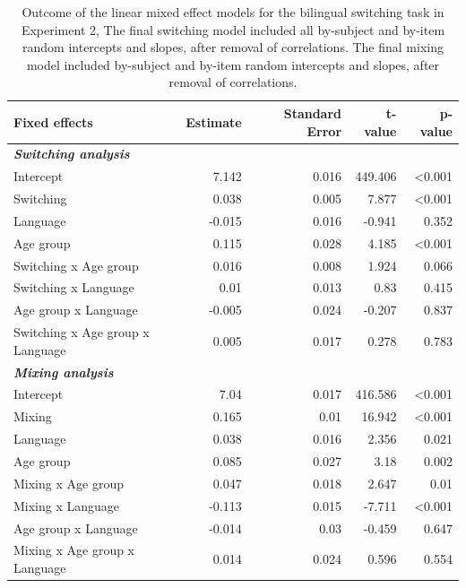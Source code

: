 \documentclass[
]{article}
\begin{document}
\begin{table}

\caption{\label{tab:Table4}Outcome of the linear mixed effect models for the bilingual switching task in Experiment 2, The final switching model included all by-subject and by-item random intercepts and slopes, after removal of correlations. The final mixing model included by-subject and by-item random intercepts and slopes, after removal of correlations.}
\centering
\begin{tabular}[t]{lrrrr}
\toprule
\textbf{Fixed effects} & \textbf{Estimate} & \textbf{Standard Error} & \textbf{t-value} & \textbf{p-value}\\
\midrule
\em{\textbf{Switching analysis}} & \em{\textbf{}} & \em{\textbf{}} & \em{\textbf{}} & \em{\textbf{}}\\
Intercept & 7.142 & 0.016 & 449.406 & <0.001\\
Switching & 0.038 & 0.005 & 7.877 & <0.001\\
Language & -0.015 & 0.016 & -0.941 & 0.352\\
Age group & 0.115 & 0.028 & 4.185 & <0.001\\
\addlinespace
Switching x Age group & 0.016 & 0.008 & 1.924 & 0.066\\
Switching x Language & 0.01 & 0.013 & 0.83 & 0.415\\
Age group x Language & -0.005 & 0.024 & -0.207 & 0.837\\
Switching x Age group x Language & 0.005 & 0.017 & 0.278 & 0.783\\
\em{\textbf{Mixing analysis}} & \em{\textbf{}} & \em{\textbf{}} & \em{\textbf{}} & \em{\textbf{}}\\
\addlinespace
Intercept & 7.04 & 0.017 & 416.586 & <0.001\\
Mixing & 0.165 & 0.01 & 16.942 & <0.001\\
Language & 0.038 & 0.016 & 2.356 & 0.021\\
Age group & 0.085 & 0.027 & 3.18 & 0.002\\
Mixing x Age group & 0.047 & 0.018 & 2.647 & 0.01\\
\addlinespace
Mixing x Language & -0.113 & 0.015 & -7.711 & <0.001\\
Age group x Language & -0.014 & 0.03 & -0.459 & 0.647\\
Mixing x Age group x Language & 0.014 & 0.024 & 0.596 & 0.554\\
\bottomrule
\end{tabular}
\end{table}
\end{document}
